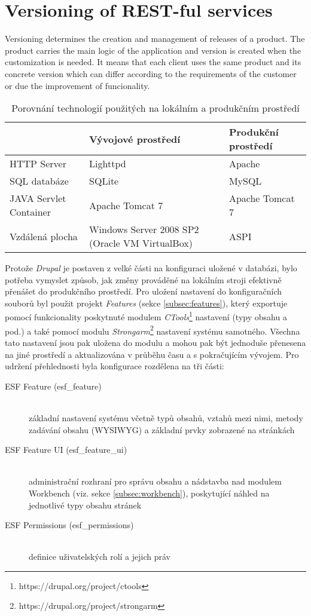 \chapter{Versioning of REST-ful services}
\label{chap:versioning}

Versioning determines the creation and management of releases of a product. The product carries the main logic of the application and version is created when the customization is needed. It means that each client uses the same product and its concrete version which can differ according to the requirements of the customer or due the improvement of funcionality. 

\begin{table}
  \caption{Porovnání technologií použitých na lokálním a produkčním prostředí}
  \begin{tabular}{ | p{3cm} | p{4cm} | p{4cm} | }
    \hline  
    & Vývojové prostředí & Produkční prostředí \\ \hline
    HTTP Server & Lighttpd & Apache \\ \hline
    SQL databáze & SQLite & MySQL \\ \hline
    JAVA Servlet Container & Apache Tomcat 7 & Apache Tomcat 7 \\ \hline
    Vzdálená plocha & Windows Server 2008 SP2 (Oracle VM VirtualBox) & ASPI \\ \hline
  \end{tabular}
\end{table}

Protože \emph{Drupal} je postaven z velké části na konfiguraci uložené v databázi, bylo potřeba vymyslet způsob, jak změny prováděné na lokálním stroji efektivně přenášet do produkčního prostředí. Pro uložení nastavení do konfiguračních souborů byl použit projekt \emph{Features} (sekce \ref{subsec:features}), který exportuje pomocí funkcionality poskytnuté modulem \emph{CTools}\footnote{https://drupal.org/project/ctools} nastavení (typy obsahu a pod.) a také pomocí modulu \emph{Strongarm}\footnote{https://drupal.org/project/strongarm} nastavení systému samotného. Všechna tato nastavení jsou pak uložena do modulu a mohou pak být jednoduše přenesena na jiné prostředí a aktualizována v průběhu času a s pokračujícím vývojem. Pro udržení přehlednosti byla konfigurace rozdělena na tři části:

\begin{description}
  \item[ESF Feature (esf\_feature)] \hfill \\ 
  základní nastavení systému včetně typů obsahů, vztahů mezi nimi, metody zadávání obsahu (WYSIWYG) a základní prvky zobrazené na stránkách
  \item[ESF Feature UI (esf\_feature\_ui)] \hfill \\ 
  administrační rozhraní pro správu obsahu a nádstavba nad modulem Workbench (viz. sekce \ref{subsec:workbench}), poskytující náhled na jednotlivé typy obsahu stránek
  \item[ESF Permissions (esf\_permissions)] \hfill \\ 
  definice uživatelských rolí a jejich práv
\end{description}

